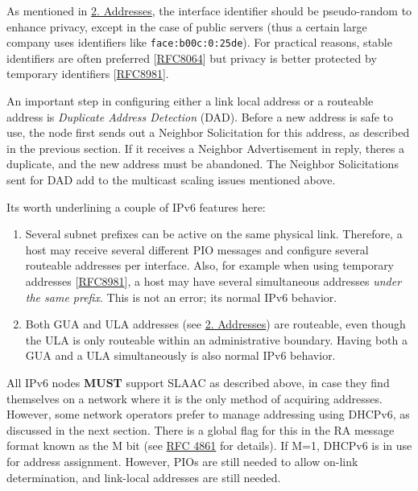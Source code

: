 \documentclass[
]{article}
\begin{document}
As mentioned in \hyperref[addresses]{2. Addresses}, the interface
identifier should be pseudo-random to enhance privacy, except in the
case of public servers (thus a certain large company uses identifiers
like \texttt{face:b00c:0:25de}). For practical reasons, stable
identifiers are often preferred
{[}\href{https://www.rfc-editor.org/info/rfc8064}{RFC8064}{]} but
privacy is better protected by temporary identifiers
{[}\href{https://www.rfc-editor.org/info/rfc8981}{RFC8981}{]}.

An important step in configuring either a link local address or a
routeable address is \emph{Duplicate Address Detection} (DAD). Before a
new address is safe to use, the node first sends out a Neighbor
Solicitation for this address, as described in the previous section. If
it receives a Neighbor Advertisement in reply, there\textquotesingle s a
duplicate, and the new address must be abandoned. The Neighbor
Solicitations sent for DAD add to the multicast scaling issues mentioned
above.

It\textquotesingle s worth underlining a couple of IPv6 features here:

\begin{enumerate}
\def\labelenumi{\arabic{enumi}.}
\item
  Several subnet prefixes can be active on the same physical link.
  Therefore, a host may receive several different PIO messages and
  configure several routeable addresses per interface. Also, for example
  when using temporary addresses
  {[}\href{https://www.rfc-editor.org/info/rfc8981}{RFC8981}{]}, a host
  may have several simultaneous addresses \emph{under the same prefix}.
  This is not an error; it\textquotesingle s normal IPv6 behavior.
\item
  Both GUA and ULA addresses (see \hyperref[addresses]{2. Addresses})
  are routeable, even though the ULA is only routeable within an
  administrative boundary. Having both a GUA and a ULA simultaneously is
  also normal IPv6 behavior.
\end{enumerate}

All IPv6 nodes \textbf{MUST} support SLAAC as described above, in case
they find themselves on a network where it is the only method of
acquiring addresses. However, some network operators prefer to manage
addressing using DHCPv6, as discussed in the next section. There is a
global flag for this in the RA message format known as the M bit (see
\href{https://www.rfc-editor.org/info/rfc4861}{RFC 4861} for details).
If M=1, DHCPv6 is in use for address assignment. However, PIOs are still
needed to allow on-link determination, and link-local addresses are
still needed.
\end{document}
